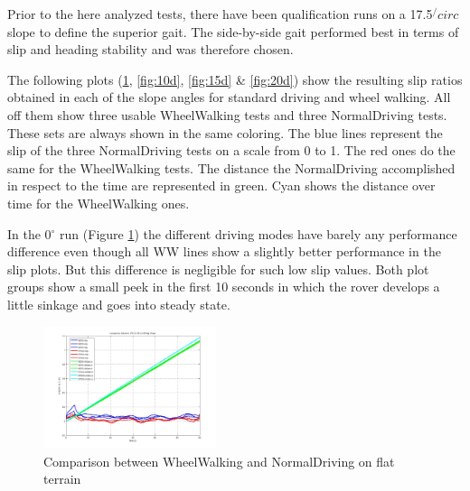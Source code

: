 \documentclass[a4paper,twocolumn]{esapub2005} %
\begin{document}
Prior to the here analyzed tests, there have been qualification runs on a 17.5$^/circ$ slope to define the superior gait.
The side-by-side gait performed best in terms of slip and heading stability and was therefore chosen. 


The following plots (\ref{fig:00d}, \ref{fig:10d}, \ref{fig:15d} \& \ref{fig:20d}) show the resulting slip ratios obtained in each of the slope angles for standard driving and wheel walking. All off them show three usable WheelWalking tests and three NormalDriving tests. These sets are always shown in the same coloring. The blue lines represent the slip of the three NormalDriving tests on a scale from 0 to 1. The red ones do the same for the WheelWalking tests. The distance the NormalDriving accomplished in respect to the time are represented in green. Cyan shows the distance over time for the WheelWalking ones.

In the 0$^\circ$ run (Figure \ref{fig:00d}) the different driving modes have barely any performance difference even though all WW lines show a slightly better performance in the slip plots. But this difference is negligible for such low slip values. Both plot groups show a small peek in the first 10 seconds in which the rover develops a little sinkage and goes into steady state. 


\begin{figure}[h!]
	\centering		\includegraphics[width=0.45\textwidth]{00d.JPG}	
	\caption{Comparison between WheelWalking and NormalDriving on flat terrain}
	\label{fig:00d}
\end{figure}
\end{document}

